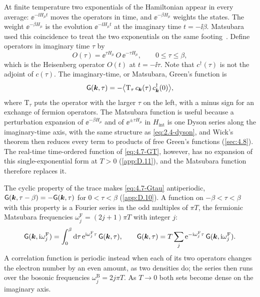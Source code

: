 At finite temperature two exponentials of the Hamiltonian appear in every average: $\ee^{-\ii H_\mu t}$ moves the operators in time, and $\ee^{-\beta H_\mu}$ weights the states. The weight $\ee^{-\beta H_\mu}$ is the evolution $\ee^{-\ii H_\mu t}$ at the imaginary time $t = -\ii\beta$. Matsubara used this coincidence to treat the two exponentials on the same footing~\cite{matsubara1955new}. Define operators in imaginary time $\tau$ by
\begin{equation*}
  O(\tau) = \ee^{\tau H_\mu}\,O\,\ee^{-\tau H_\mu}, \qquad 0 \le \tau \le \beta ,
\end{equation*}
which is the Heisenberg operator $O(t)$ at $t = -\ii\tau$. Note that $c^\dagger(\tau)$ is not the adjoint of $c(\tau)$. The imaginary-time, or Matsubara, Green's function is
\begin{equation}
  \mathsf{G}(\bm{k},\tau) = -\bigl\langle\mathrm{T}_\tau\,c_{\bm{k}}(\tau)\,c^\dagger_{\bm{k}}(0)\bigr\rangle ,
  \label{eq:4.7-Gtau}
\end{equation}
where $\mathrm{T}_\tau$ puts the operator with the larger $\tau$ on the left, with a minus sign for an exchange of fermion operators. The Matsubara function is useful because a perturbation expansion of $\ee^{-\beta H_\mu}$ and of $\ee^{\pm\tau H_\mu}$ in $H_{\mathrm{int}}$ is one Dyson series along the imaginary-time axis, with the same structure as \cref{eq:2.4-dyson}, and Wick's theorem then reduces every term to products of free Green's functions (\cref{sec:4.8}). The real-time time-ordered function of \cref{eq:4.7-GT}, however, has no expansion of this single-exponential form at $T > 0$ (\cref{app:D.11}), and the Matsubara function therefore replaces it.

The cyclic property of the trace makes \cref{eq:4.7-Gtau} antiperiodic, $\mathsf{G}(\bm{k},\tau - \beta) = -\mathsf{G}(\bm{k},\tau)$ for $0 < \tau < \beta$ (\cref{app:D.10}). A function on $-\beta < \tau < \beta$ with this property is a Fourier series in the odd multiples of $\pi T$, the fermionic Matsubara frequencies $\omega^{\mathrm{F}}_j = (2j + 1)\pi T$ with integer $j$:
\begin{equation}
  \mathsf{G}(\bm{k},\mathrm{i}\omega^{\mathrm{F}}_j) = \int_0^\beta\mathrm{d}\tau\,\mathrm{e}^{\mathrm{i}\omega^{\mathrm{F}}_j\tau}\,\mathsf{G}(\bm{k},\tau), \qquad
  \mathsf{G}(\bm{k},\tau) = T\sum_j\mathrm{e}^{-\mathrm{i}\omega^{\mathrm{F}}_j\tau}\,\mathsf{G}(\bm{k},\mathrm{i}\omega^{\mathrm{F}}_j) .
  \label{eq:4.7-Gmats}
\end{equation}
A correlation function is periodic instead when each of its two operators changes the electron number by an even amount, as two densities do; the series then runs over the bosonic frequencies $\omega^{\mathrm{B}}_j = 2j\pi T$. As $T \to 0$ both sets become dense on the imaginary axis.

